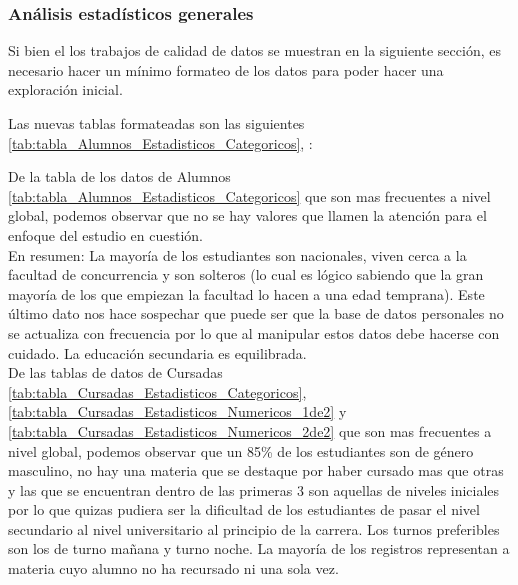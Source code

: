 
\subsubsection{Análisis estadísticos generales}

Si bien el los trabajos de calidad de datos se muestran en la siguiente sección, es necesario hacer un mínimo formateo de los datos para poder hacer una exploración inicial.

Las nuevas tablas formateadas son las siguientes \ref{tab:tabla_Alumnos_Estadisticos_Categoricos},  :



De la tabla de los datos de Alumnos \ref{tab:tabla_Alumnos_Estadisticos_Categoricos} que son mas frecuentes a nivel global, podemos observar que no se hay valores que llamen la atención para el enfoque del estudio en cuestión. \\
En resumen: La mayoría de los estudiantes son nacionales, viven cerca a la facultad de concurrencia y son solteros (lo cual es lógico sabiendo que la gran mayoría de los que empiezan la facultad lo hacen a una edad temprana). Este último dato nos hace sospechar que puede ser que la base de datos personales no se actualiza con frecuencia por lo que al manipular estos datos debe hacerse con cuidado.
La educación secundaria es equilibrada.
\\





De las tablas de datos de Cursadas \ref{tab:tabla_Cursadas_Estadisticos_Categoricos}, \ref{tab:tabla_Cursadas_Estadisticos_Numericos_1de2} y \ref{tab:tabla_Cursadas_Estadisticos_Numericos_2de2} que son mas frecuentes a nivel global, podemos observar que un 85\% de los estudiantes son de género masculino, no hay una materia que se destaque por haber cursado mas que otras y las que se encuentran dentro de las primeras 3 son aquellas de niveles iniciales por lo que quizas pudiera ser la dificultad de los estudiantes de pasar el nivel secundario al nivel universitario al principio de la carrera. Los turnos preferibles son los de turno mañana y turno noche. La mayoría de los registros representan a materia cuyo alumno no ha recursado ni una sola vez.

